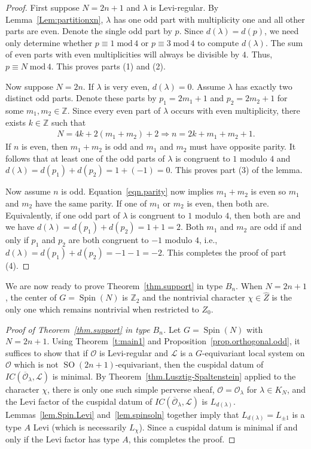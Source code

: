 \documentclass[reqno,11pt]{amsart}
\theoremstyle{remark}
\theoremstyle{remark}
\theoremstyle{definition}
\theoremstyle{definition}
\theoremstyle{definition}
\numberwithin{equation}{section}
\newcommand{\Z}{\mathbb{ Z}}           %
\newcommand{\SO}{\operatorname{SO}}
\newcommand{\Spin}{\operatorname{Spin}}
\newcommand{\cl}{\mathcal{L}}
\newcommand{\co}{\mathcal{O}}
\renewcommand{\mod}{\;\mathrm{mod}\,}
\renewcommand{\hat}{\widehat}
\begin{document}
\begin{proof}
First suppose $N = 2n+1$ and $\lambda$ is Levi-regular.  By Lemma~\ref{Lem:partitionxn}, $\lambda$ has one odd part with multiplicity one and all other parts are even.  Denote the single odd part by $p$.  Since $d(\lambda)=d(p)$, we need only determine whether $p\equiv 1 \mod 4$ or $p\equiv 3\mod 4$ to compute $d(\lambda)$.  The sum of even parts with even multiplicities will always be divisible by $4$.  Thus, $p \equiv N\mod 4$.  This proves parts (1) and (2).

Now suppose $N = 2n$.  If $\lambda$ is very even, $d(\lambda)=0$. Assume $\lambda$ has exactly two distinct odd parts. Denote these parts by $p_1=2m_1+1$ and $p_2=2m_2+1$ for some $m_1, m_2\in \Z$. Since every even part of $\lambda$ occurs with even multiplicity, there exists $k\in \Z$ such that 
\begin{align}\label{eqn.parity}
N = 4k + 2(m_1+m_2)+2 \Rightarrow n = 2k+ m_1+m_2+1.
\end{align}
If $n$ is even, then $m_1+m_2$ is odd and $m_1$ and $m_2$ must have opposite parity. It follows that at least one of the odd parts of $\lambda$ is congruent to $1$ modulo $4$ and $d(\lambda) = d(p_1)+d(p_2)=1+(-1) = 0$. This proves part (3) of the lemma.


Now assume $n$ is odd. Equation~\eqref{eqn.parity} now implies $m_1+m_2$ is even so $m_1$ and $m_2$ have the same parity. If one of $m_1$ or $m_2$ is even, then both are. Equivalently, if one odd part of $\lambda$ is congruent to $1$ modulo $4$, then both are and we have $d(\lambda) = d(p_1)+d(p_2)=1+1=2$. Both $m_1$ and $m_2$ are odd if and only if $p_1$ and $p_2$ are both congruent to $-1$ modulo $4$, i.e., $d(\lambda) = d(p_1)+d(p_2)=-1-1=-2$. This completes the proof of part (4).
\end{proof}


We are now ready to prove Theorem~\ref{thm.support} in type $B_n$.  When $N=2n+1$, the center of $G=\Spin(N)$ is $\Z_2$ and the nontrivial character $\chi\in \hat{Z}$ is the only one which remains nontrivial when restricted to $Z_0$. 

\begin{proof}[Proof of Theorem~\ref{thm.support} in type $B_n$] Let $G= \Spin(N)$ with $N=2n+1$. Using Theorem~\ref{t:main1} and  Proposition~\ref{prop.orthogonal.odd}, it suffices to show that if $\co$ is Levi-regular and $\cl$ is a $G$-equivariant local system on $\co$ which is not $\SO(2n+1)$-equivariant, then the cuspidal datum of $IC(\overline{\co}_\lambda, \cl)$ is minimal. By Theorem~\ref{thm.Lusztig-Spaltenstein} applied to the character $\chi$, there is only one such simple perverse sheaf, $\co=\co_\lambda$ for $\lambda\in K_{N}$, and the Levi factor of the cuspidal datum of $IC(\overline{\co}_\lambda, \cl)$ is $L_{d(\lambda)}$. Lemmas~\ref{lem.Spin.Levi} and~\ref{lem.spinsoln} together imply that $L_{d(\lambda)} = L_{\pm 1}$ is a type $A$ Levi (which is necessarily $L_\chi$). Since a cuspidal datum is minimal if and only if the Levi factor has type $A$, this completes the proof. 
\end{proof}
\end{document}
